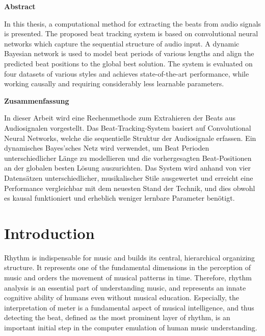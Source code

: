 \documentclass{scrartcl}
\begin{document}
\newpage 
\begin{center} 
\textsf{\textbf{Abstract}}
\end{center}

In this thesis, a computational method for extracting the beats from audio signals is presented. The proposed beat tracking system is based on convolutional neural networks which capture the sequential structure of audio input. A dynamic Bayesian network is used to model beat periods of various lengths and align the predicted beat positions to the global best solution. The system is evaluated on four datasets of various styles and achieves state-of-the-art performance, while working causally and requiring considerably less learnable parameters.  



\vspace{15em}


\begin{center} 
\textsf{\textbf{Zusammenfassung}}
\end{center}

In dieser Arbeit wird eine Rechenmethode zum Extrahieren der Beats aus Audiosignalen vorgestellt. Das Beat-Tracking-System basiert auf Convolutional Neural Networks, welche die sequentielle Struktur der Audiosignale erfassen. Ein dynamisches Bayes'sches Netz wird verwendet, um Beat Perioden unterschiedlicher Länge zu modellieren und die vorhergesagten Beat-Positionen an der globalen besten Lösung auszurichten. Das System wird anhand von vier Datensätzen unterschiedlicher, musikalischer Stile ausgewertet und erreicht eine Performance vergleichbar mit dem neuesten Stand der Technik, und dies obwohl es kausal funktioniert und erheblich weniger lernbare Parameter benötigt.

\newpage

\tableofcontents
\newpage



\section{Introduction}
\label{sec:introduction}

Rhythm is indispensable for music and builds its central, hierarchical organizing structure. It represents one of the fundamental dimensions in the perception of music and orders the movement of musical patterns in time. Therefore, rhythm analysis is an essential part of understanding music, and represents an innate cognitive ability of humans even without musical education. Especially, the interpretation of meter is a fundamental aspect of musical intelligence, and thus detecting the beat, defined as the most prominent layer of rhythm, is an important initial step in the computer emulation of human music understanding. 
\end{document}
